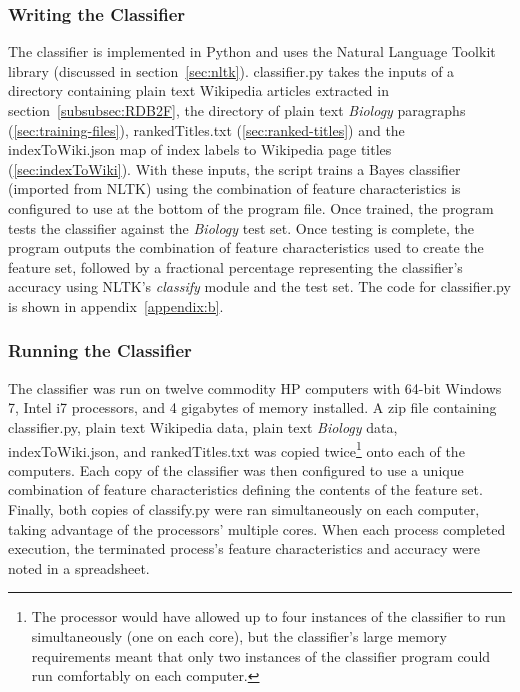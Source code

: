 \subsubsection{Writing the Classifier}

The classifier is implemented in Python and uses the Natural Language Toolkit library (discussed in section~\ref{sec:nltk}).
classifier.py takes the inputs of a directory containing plain text Wikipedia articles extracted in section~\ref{subsubsec:RDB2F}, the directory of plain text {\it Biology} paragraphs (\ref{sec:training-files}), rankedTitles.txt (\ref{sec:ranked-titles}) and the indexToWiki.json map of index labels to Wikipedia page titles (\ref{sec:indexToWiki}).
With these inputs, the script trains a \naive Bayes classifier (imported from NLTK) using the combination of feature characteristics is configured to use at the bottom of the program file.
Once trained, the program tests the classifier against the {\it Biology} test set.
Once testing is complete, the program outputs the combination of feature characteristics used to create the feature set, followed by a fractional percentage representing the classifier's accuracy using NLTK's {\it classify} module and the test set.
The code for classifier.py is shown in appendix~\ref{appendix:b}.

\subsubsection{Running the Classifier}

The classifier was run on twelve commodity HP computers with 64-bit Windows 7, Intel i7 processors, and 4 gigabytes of memory installed.
A zip file containing classifier.py, plain text Wikipedia data, plain text {\it Biology} data, indexToWiki.json, and rankedTitles.txt was copied twice\footnote{The processor would have allowed up to four instances of the classifier to run simultaneously (one on each core), but the classifier's large memory requirements meant that only two instances of the classifier program could run comfortably on each computer.} onto each of the computers.
Each copy of the classifier was then configured to use a unique combination of feature characteristics defining the contents of the feature set.
Finally, both copies of classify.py were ran simultaneously on each computer, taking advantage of the processors' multiple cores.
When each process completed execution, the terminated process's feature characteristics and accuracy were noted in a spreadsheet.

